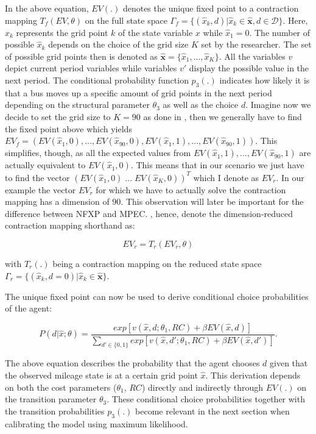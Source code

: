In the above equation, $EV(.)$ denotes the unique fixed point to a contraction mapping $T_f(EV, \theta)$ on the full state space $\Gamma_f = \{(\hat x_k, d)|\hat x_k \in \mathbf{\hat x}, d \in \mathcal{D}\}$. Here, $\hat x_k$ represents the grid point $k$ of the state variable $x$ while $\hat x_1 = 0$. The number of possible $\hat x_k$ depends on the choice of the grid size $K$ set by the researcher. The set of possible grid points then is denoted as $\mathbf{\hat x} = \{\hat x_1, ..., \hat x_K\}$. All the variables $v$ depict current period variables while variables $v'$ display the possible value in the next period. The conditional probability function $p_3(.)$ indicates how likely it is that a bus moves up a specific amount of grid points in the next period depending on the structural parameter $\theta_3$ as well as the choice $d$. Imagine now we decide to set the grid size to $K=90$ as done in \cite{Rust.1987}, then we generally have to find the fixed point above which yields $EV_f = (EV(\hat x_1, 0), ..., EV(\hat x_{90}, 0), EV(\hat x_1, 1), ..., EV(\hat x_{90}, 1))$. This simplifies, though, as all the expected values from $EV(\hat x_1, 1), ..., EV(\hat x_{90}, 1)$ are actually equivalent to $EV(\hat x_1, 0)$. This means that in our scenario we just have to find the vector $(EV(\hat x_1, 0)\; ...\; EV(\hat x_K, 0))^T$ which I denote as $EV_r$. In our example the vector $EV_r$ for which we have to actually solve the contraction mapping has a dimension of $90$. This observation will later be important for the difference between NFXP and MPEC. \cite{Su.Judd.2012}, hence, denote the dimension-reduced contraction mapping shorthand as:

\begin{equation}
EV_r = T_r(EV_r, \theta)
\end{equation}

with $T_r(.)$ being a contraction mapping on the reduced state space $\Gamma_r = \{(\hat x_k, d=0)|\hat x_k \in \mathbf{\hat x}\}$.

The unique fixed point can now be used to derive conditional choice probabilities of the agent:

\begin{equation}
	\label{eq7}
	P(d|\hat x; \theta) = \frac{exp[v(\hat x, d; \theta_1, RC) + \beta EV(\hat x, d)]}{\sum_{d' \in \{0, 1\}} exp[v(\hat x, d'; \theta_1, RC) + \beta EV(\hat x, d')]}.
\end{equation}

The above equation describes the probability that the agent chooses $d$ given that the observed mileage state is at a certain grid point $\hat x$. This derivation depends on both the cost parameters ($\theta_1$, $RC$) directly and indirectly through $EV(.)$ on the transition parameter $\theta_3$. These conditional choice probabilities together with the transition probabilities $p_3(.)$ become relevant in the next section when calibrating the model using maximum likelihood.


